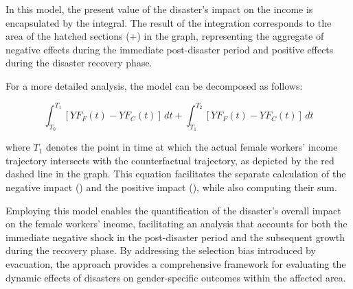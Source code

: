 \documentclass[a4paper,12pt]{article}
\begin{document}
In this model, the present value of the disaster's impact on the income is encapsulated by the integral. The result of the integration corresponds to the area of the hatched sections (+) in the graph, representing the aggregate of negative effects during the immediate post-disaster period and positive effects during the disaster recovery phase.

For a more detailed analysis, the model can be decomposed as follows:

\begin{equation}
\int_{T_0}^{T_1} \left[ YF_F(t) - YF_C(t) \right] \, dt + \int_{T_1}^{T_2} \left[ YF_F(t) - YF_C(t) \right] \, dt
\end{equation}

where $T_{1}$ denotes the point in time at which the actual female workers' income trajectory intersects with the counterfactual trajectory, as depicted by the red dashed line in the graph. This equation facilitates the separate calculation of the negative impact () and the positive impact (), while also computing their sum.

Employing this model enables the quantification of the disaster's overall impact on the female workers’
income, facilitating an analysis that accounts for both the immediate negative shock in the post-disaster period and the subsequent growth during the recovery phase. By addressing the selection bias introduced by evacuation, the approach provides a comprehensive framework for evaluating the dynamic effects of disasters on gender-specific outcomes within the affected area.
\clearpage
\appendix

\vspace*{0.5in} %
\noindent{}

\renewcommand{\thesubsection}{\Alph{subsection}}

\vspace{1em} %



\end{document}
